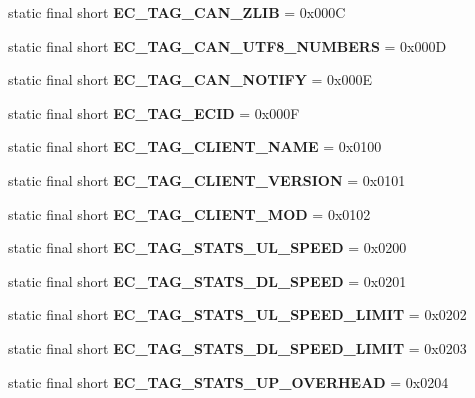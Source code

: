 \begin{DoxyCompactItemize}
\item 
static final short {\bfseries EC\_\-TAG\_\-CAN\_\-ZLIB} = 0x000C\label{interfaceECCodes_ad9e5f5ace8dd002422423e174971d3d8}

\item 
static final short {\bfseries EC\_\-TAG\_\-CAN\_\-UTF8\_\-NUMBERS} = 0x000D\label{interfaceECCodes_a3a5e2ece74c940a1a8237112daa11f7b}

\item 
static final short {\bfseries EC\_\-TAG\_\-CAN\_\-NOTIFY} = 0x000E\label{interfaceECCodes_a06a8c0de107543a98914009babb25ecd}

\item 
static final short {\bfseries EC\_\-TAG\_\-ECID} = 0x000F\label{interfaceECCodes_a7446b9d5c4b6e6702aaf9f9edd514ec2}

\item 
static final short {\bfseries EC\_\-TAG\_\-CLIENT\_\-NAME} = 0x0100\label{interfaceECCodes_a035d469efccd02192a5677363995a153}

\item 
static final short {\bfseries EC\_\-TAG\_\-CLIENT\_\-VERSION} = 0x0101\label{interfaceECCodes_a73577ef481a58cb202fd3f14cd5add51}

\item 
static final short {\bfseries EC\_\-TAG\_\-CLIENT\_\-MOD} = 0x0102\label{interfaceECCodes_a0da96715576ca79909de05961427416c}

\item 
static final short {\bfseries EC\_\-TAG\_\-STATS\_\-UL\_\-SPEED} = 0x0200\label{interfaceECCodes_a529d92c4f92192bbca3d3f1c10720aba}

\item 
static final short {\bfseries EC\_\-TAG\_\-STATS\_\-DL\_\-SPEED} = 0x0201\label{interfaceECCodes_a2702bad8becb69a06c2d204303c6812e}

\item 
static final short {\bfseries EC\_\-TAG\_\-STATS\_\-UL\_\-SPEED\_\-LIMIT} = 0x0202\label{interfaceECCodes_ab9d4a1e7b4246b8c5bf941986b17cb40}

\item 
static final short {\bfseries EC\_\-TAG\_\-STATS\_\-DL\_\-SPEED\_\-LIMIT} = 0x0203\label{interfaceECCodes_a386cc6fa525462bd99149966a8e80080}

\item 
static final short {\bfseries EC\_\-TAG\_\-STATS\_\-UP\_\-OVERHEAD} = 0x0204\label{interfaceECCodes_a7339be23e1a6babc4b9ba58897388ce3}


\end{DoxyCompactItemize}
